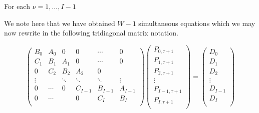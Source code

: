 \documentclass[10pt]{article}
\begin{document}
For each $ \nu = 1 , \dots , I-1 $

We note here that we have obtained $W-1$ simultaneous equations which
we may now rewrite in the following tridiagonal matrix notation.

\begin{equation}
\begin{pmatrix}
    B_0    & A_0   & 0      & 0      & \cdots  & 0       \\
    C_1    & B_1   & A_1    & 0      & \cdots  & 0       \\
    0      & C_2   & B_2    & A_2    & 0      &         \\
    \vdots &       & \ddots & \ddots & \ddots & \vdots  \\
    0      & \cdots & 0      & C_{I-1}& B_{I-1}& A_{I-1} \\
    0      & \cdots &        & 0      & C_I    & B_I     \\
\end{pmatrix} 
\begin{pmatrix}
    P_{0,\tau+1}   \\
    P_{1,\tau+1}   \\
    P_{2,\tau+1}   \\
    \vdots         \\
    P_{I-1,\tau+1} \\
    P_{I,\tau+1}   \\
\end{pmatrix}
=
\begin{pmatrix}
    D_0     \\
    D_1     \\
    D_2     \\
    \vdots  \\
    D_{I-1} \\
    D_I     \\
\end{pmatrix}
\end{equation}
\end{document}
